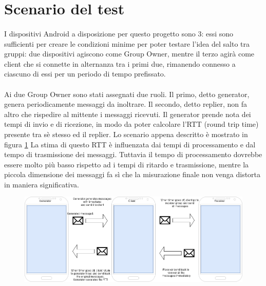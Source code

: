 \documentclass{llncs}
\begin{document}
	
	

\section{Scenario del test}

\paragraph{} I dispositivi Android a disposizione per questo progetto sono 3: essi sono sufficienti per creare le condizioni minime per poter testare l'idea del salto tra gruppi: due dispositivi agiscono come Group Owner, mentre il terzo agirà come client che si connette in alternanza tra i primi due, rimanendo connesso a ciascuno di essi per un periodo di tempo prefissato.

\paragraph{} Ai due Group Owner sono stati assegnati due ruoli. Il primo, detto generator, genera periodicamente messaggi da inoltrare. Il secondo, detto replier, non fa altro che rispedire al mittente i messaggi ricevuti. Il generator prende nota dei tempi di invio e di ricezione, in modo da poter calcolare l'RTT (round trip time) presente tra sè stesso ed il replier. Lo scenario appena descritto è mostrato in figura \ref{fig:scenario} La stima di questo RTT è influenzata dai tempi di processamento e dal tempo di trasmissione dei messaggi. Tuttavia il tempo di processamento dovrebbe essere molto più basso rispetto ad i tempi di ritardo e trasmissione, mentre la piccola dimensione dei messaggi fa sì che la misurazione finale non venga distorta in maniera significativa.

\begin{figure}[H]
	\includegraphics[scale=0.3,center]{img/archp2p.png}
	\caption{}
	\label{fig:scenario}
\end{figure}
\noindent
\end{document}
